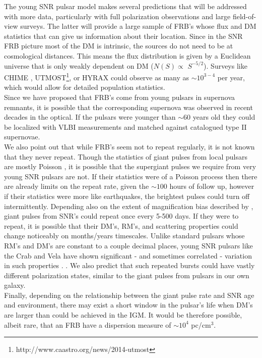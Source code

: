 \documentclass[useAMS,usenatbib]{emulateapj}
\begin{document}
The young SNR pulsar model makes several predictions that will
be addressed with more data, particularly with full polarization 
observations and large field-of-view surveys. 
The latter will provide a large sample of FRB's whose flux and DM statistics
that can give us information about their location. Since in the SNR FRB picture
most of the DM is intrinsic, the sources do not need to be at cosmological 
distances. This means the flux distribution is given by a Euclidean universe
that is only weakly dependent on DM ($N(S) \propto$ $S^{-5/2}$). Surveys
like CHIME \citep{2014SPIE.9145E..22B}, 
UTMOST\footnote{http://www.caastro.org/news/2014-utmost},
 or HYRAX could observe as many as $\sim10^{3-4}$
per year, which would allow for detailed population statistics.
\\
Since we have proposed that FRB's come from young pulsars 
in supernova remnants, it is possible that the corresponding 
supernova was observed in recent decades in the optical. If the pulsars
were younger than $\sim$60 years old they could be localized with VLBI
measurements and matched against catalogued type II supernovae. 
\\
We also point out that while FRB's seem not to repeat regularly, 
it is not known that they never repeat. Though the statistics 
of giant pulses from local pulsars are mostly Poisson \citep{1999ApJ...517..460S},
it is possible that 
the supergiant pulses we require from very young SNR pulsars are not. If their 
statistics were of a Poisson process then there are already limits on the repeat rate, 
given the $\sim100$ hours of follow up, however if their statistics were more like
earthquakes, the brightest pulses could turn off intermittently. 
Depending also on the extent of
magnification bias described by \cite{2014ApJ...789L..26P}, giant pulses
from SNR's could repeat once every 5-500 days. 
If they were to repeat,
it is possible that their DM's, RM's, and scattering properties could 
change noticeably on months/years timescales. Unlike standard pulsars 
whose RM's and DM's are constant to a couple decimal places, young 
SNR pulsars like the Crab and Vela have shown significant - and sometimes
correlated - variation in such properties \citep{1988A&A...202..166R, 2008A&A...483...13K}.
. We also predict that such repeated 
bursts could have vastly different polarization states, similar to the giant 
pulses from pulsars in our own galaxy.
\\
Finally, depending on the relationship between the giant pulse rate and SNR
age and environment, there may exist a short window in the pulsar's life when 
DM's are larger than could be achieved in the IGM. It would be therefore 
possible, albeit rare, that an FRB have a dispersion
 measure of $\sim10^4$ pc/cm$^3$.
\end{document}

